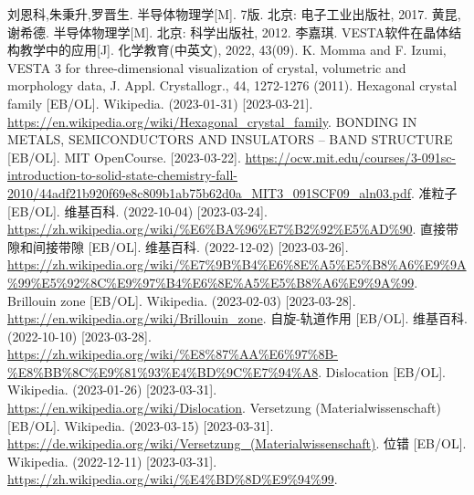 \begin{thebibliography}{99}%
     刘恩科,朱秉升,罗晋生. 半导体物理学[M]. 7版. 北京: 电子工业出版社, 2017.
     黄昆,谢希德. 半导体物理学[M]. 北京: 科学出版社, 2012.
     李嘉琪. VESTA软件在晶体结构教学中的应用[J]. 化学教育(中英文), 2022, 43(09).
     K. Momma and F. Izumi, VESTA 3 for three-dimensional visualization of crystal, volumetric and morphology data, J. Appl. Crystallogr., 44, 1272-1276 (2011).
     Hexagonal crystal family [EB/OL]. Wikipedia. (2023-01-31) [2023-03-21].\\ \url{https://en.wikipedia.org/wiki/Hexagonal_crystal_family}.
     BONDING IN METALS, SEMICONDUCTORS AND
    INSULATORS – BAND STRUCTURE [EB/OL]. MIT OpenCourse. [2023-03-22]. \url{https://ocw.mit.edu/courses/3-091sc-introduction-to-solid-state-chemistry-fall-2010/44adf21b920f69e8c809b1ab75b62d0a_MIT3_091SCF09_aln03.pdf}.
     准粒子 [EB/OL]. 维基百科. (2022-10-04) [2023-03-24].\\ \url{https://zh.wikipedia.org/wiki/%E6%BA%96%E7%B2%92%E5%AD%90}.
     直接带隙和间接带隙 [EB/OL]. 维基百科. (2022-12-02) [2023-03-26].\\ \url{https://zh.wikipedia.org/wiki/%E7%9B%B4%E6%8E%A5%E5%B8%A6%E9%9A%99%E5%92%8C%E9%97%B4%E6%8E%A5%E5%B8%A6%E9%9A%99}.
     Brillouin zone [EB/OL]. Wikipedia. (2023-02-03) [2023-03-28].\\ \url{https://en.wikipedia.org/wiki/Brillouin_zone}.
     自旋-轨道作用 [EB/OL]. 维基百科. (2022-10-10) [2023-03-28].\\ \url{https://zh.wikipedia.org/wiki/%E8%87%AA%E6%97%8B-%E8%BB%8C%E9%81%93%E4%BD%9C%E7%94%A8}.
     Dislocation [EB/OL]. Wikipedia. (2023-01-26) [2023-03-31].\\ \url{https://en.wikipedia.org/wiki/Dislocation}.
     Versetzung (Materialwissenschaft) [EB/OL]. Wikipedia. (2023-03-15) [2023-03-31].\\ \url{https://de.wikipedia.org/wiki/Versetzung_(Materialwissenschaft)}.
     位错 [EB/OL]. Wikipedia. (2022-12-11) [2023-03-31].\\ \url{https://zh.wikipedia.org/wiki/%E4%BD%8D%E9%94%99}.
\end{thebibliography}
